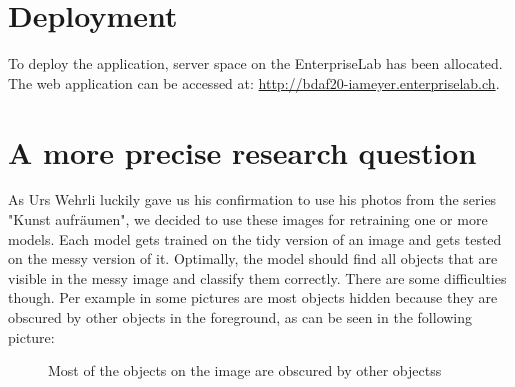\section{Deployment}

To deploy the application, server space on the EnterpriseLab has been allocated. The web application can be accessed at: \url{http://bdaf20-iameyer.enterpriselab.ch}.

\section{A more precise research question}

As Urs Wehrli luckily gave us his confirmation to use his photos from the series "Kunst aufräumen", we decided to use these images for retraining one or more models. Each model gets trained on the tidy version of an image and gets tested on the messy version of it. Optimally, the model should find all objects that are visible in the messy image and classify them correctly. There are some difficulties though. Per example in some pictures are most objects hidden because they are obscured by other objects in the foreground, as can be seen in the following picture:

 \begin{figure}[H]
	\caption{\label{fig:ka-fruechte-messy} Most of the objects on the image are obscured by other objectss}
\end{figure}

